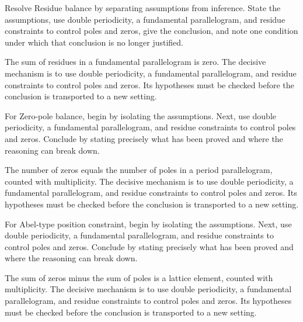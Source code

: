 \begin{problem}\label{prob:iv28-problem-04}
Resolve Residue balance by separating assumptions from inference. State the assumptions, use double periodicity, a fundamental parallelogram, and residue constraints to control poles and zeros, give the conclusion, and note one condition under which that conclusion is no longer justified.
\end{problem}
\begin{solution}
The sum of residues in a fundamental parallelogram is zero. The decisive mechanism is to use double periodicity, a fundamental parallelogram, and residue constraints to control poles and zeros. Its hypotheses must be checked before the conclusion is transported to a new setting.
\end{solution}

\begin{problem}\label{prob:iv28-problem-05}
For Zero-pole balance, begin by isolating the assumptions. Next, use double periodicity, a fundamental parallelogram, and residue constraints to control poles and zeros. Conclude by stating precisely what has been proved and where the reasoning can break down.
\end{problem}
\begin{solution}
The number of zeros equals the number of poles in a period parallelogram, counted with multiplicity. The decisive mechanism is to use double periodicity, a fundamental parallelogram, and residue constraints to control poles and zeros. Its hypotheses must be checked before the conclusion is transported to a new setting.
\end{solution}

\begin{problem}\label{prob:iv28-problem-06}
For Abel-type position constraint, begin by isolating the assumptions. Next, use double periodicity, a fundamental parallelogram, and residue constraints to control poles and zeros. Conclude by stating precisely what has been proved and where the reasoning can break down.
\end{problem}
\begin{solution}
The sum of zeros minus the sum of poles is a lattice element, counted with multiplicity. The decisive mechanism is to use double periodicity, a fundamental parallelogram, and residue constraints to control poles and zeros. Its hypotheses must be checked before the conclusion is transported to a new setting.
\end{solution}

